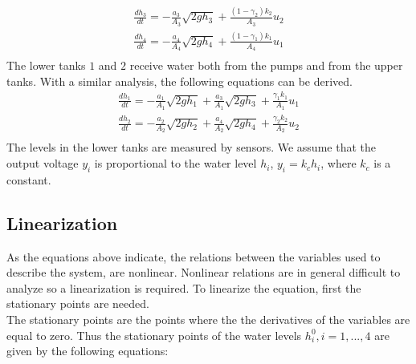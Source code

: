 \documentclass[a4paper,12pt,oneside,onecolumn]{article}
\begin{document}
\begin{equation}
\begin{aligned}
\frac{dh_3}{dt} = -\frac{a_3}{A_3} \sqrt{2 g h_3} + \frac{(1-\gamma_2) k_2}{A_3} u_2 \\
\frac{dh_4}{dt} = -\frac{a_4}{A_4} \sqrt{2 g h_4} + \frac{(1-\gamma_1) k_1}{A_4} u_1 \\
\end{aligned}
\end{equation}
The lower tanks $1$ and $2$ receive water both from the pumps and from the upper tanks. With a similar analysis, the following equations can be derived. 
\begin{equation}
\begin{aligned}
\frac{dh_1}{dt} = -\frac{a_1}{A_1} \sqrt{2 g h_1} + \frac{a_3}{A_1} \sqrt{2 g h_3}  + \frac{\gamma_1 k_1}{A_1} u_1 \\
\frac{dh_2}{dt} = -\frac{a_2}{A_2} \sqrt{2 g h_2} + \frac{a_4}{A_2} \sqrt{2 g h_4}  + \frac{\gamma_2 k_2}{A_2} u_2 \\
\end{aligned}
\end{equation}
The levels in the lower tanks are measured by sensors. We assume that the output voltage $y_i$ is proportional to the water level $h_i$, $y_i = k_c h_i$, where $k_c$ is a constant. 
\subsection{Linearization}
As the equations above indicate, the relations between the variables used to describe the system, are nonlinear. Nonlinear relations are in general difficult to analyze so a linearization is required. To linearize the equation, first the stationary points are needed. \\
The stationary points are the points where the the derivatives of the variables are equal to zero. Thus the stationary points of the water levels $h_i^0, i = 1,...,4$ are given by the following equations:
\end{document}
